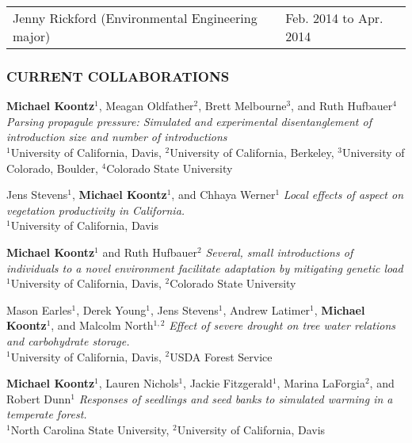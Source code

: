 \documentclass[11pt,english]{article}
\providecommand{\tabularnewline}{\\}
\begin{document}
\begin{tabular}{>{\raggedright}p{4in}>{\raggedleft}p{2in}}
Jenny Rickford (Environmental Engineering major) & Feb. 2014 to Apr. 2014
\end{tabular}


\subsubsection*{CURRENT COLLABORATIONS}
\vspace{-0.5ex}

\begin{hangparas}{0.4in}{1}

\hspace{0.575em}\textbf{Michael Koontz}$^{1}$, Meagan Oldfather$^{2}$, Brett Melbourne$^{3}$, and Ruth Hufbauer$^{4}$
\emph{Parsing propagule pressure: Simulated and experimental disentanglement of introduction size and number of introductions} \tabularnewline
$^{1}$University of California, Davis, $^{2}$University of California, Berkeley, $^{3}$University of Colorado, Boulder, $^{4}$Colorado State University 

\hspace{0.575em}Jens Stevens$^{1}$, \textbf{Michael Koontz}$^{1}$, and Chhaya Werner$^{1}$
\emph{Local effects of aspect on vegetation productivity in California.}\tabularnewline
$^{1}$University of California, Davis

\hspace{0.575em}\textbf{Michael Koontz}$^{1}$ and Ruth Hufbauer$^{2}$
\emph{Several, small introductions of individuals to a novel environment facilitate adaptation by mitigating genetic load} \tabularnewline
$^{1}$University of California, Davis, $^{2}$Colorado State University 

\hspace{0.575em}Mason Earles$^{1}$, Derek Young$^{1}$, Jens Stevens$^{1}$, Andrew Latimer$^{1}$, \textbf{Michael Koontz}$^{1}$, and Malcolm North$^{1,2}$
\emph{Effect of severe drought on tree water relations and carbohydrate storage.}\tabularnewline
$^{1}$University of California, Davis, $^{2}$USDA Forest Service

\hspace{0.575em}\textbf{Michael Koontz}$^{1}$, Lauren Nichols$^{1}$, Jackie Fitzgerald$^{1}$, Marina LaForgia$^{2}$, and Robert Dunn$^{1}$ 
\emph{Responses of seedlings and seed banks to simulated warming in a temperate forest.} \tabularnewline
$^{1}$North Carolina State University, $^{2}$University of California, Davis

\end{hangparas}
\vspace{1ex}
\end{document}
